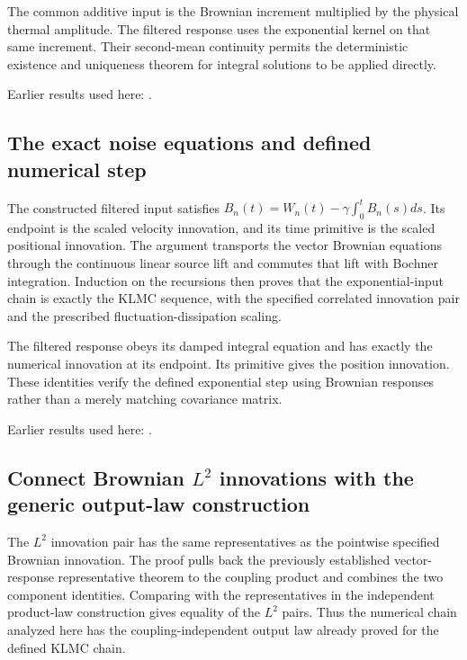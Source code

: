 \documentclass[11pt,a4paper]{report}
\begin{document}
The common additive input is the Brownian increment multiplied by the physical thermal amplitude. The filtered response uses the exponential kernel on that same increment. Their second-mean continuity permits the deterministic existence and uniqueness theorem for integral solutions to be applied directly.



Earlier results used here: \cite[Section~3.17.1]{LangevinLean2026ULASC}.
\subsection{\texorpdfstring{The exact noise equations and defined numerical step}{The exact noise equations and defined numerical step}}
\label{report-step-KineticLangevin-CanonicalCoupledSegments-lean-3}


The constructed filtered input satisfies \(B_n(t)=W_n(t)-\gamma\int_0^tB_n(s)ds\). Its endpoint is the scaled velocity innovation, and its time primitive is the scaled positional innovation. The argument transports the vector Brownian equations through the continuous linear source lift and commutes that lift with Bochner integration. Induction on the recursions then proves that the exponential-input chain is exactly the KLMC sequence, with the specified correlated innovation pair and the prescribed fluctuation-dissipation scaling.



The filtered response obeys its damped integral equation and has exactly the numerical innovation at its endpoint. Its primitive gives the position innovation. These identities verify the defined exponential step using Brownian responses rather than a merely matching covariance matrix.



Earlier results used here: \cite[Section~3.17.1]{LangevinLean2026ULASC}.
\subsection{\texorpdfstring{Connect Brownian \(L^{2}\) innovations with the generic output-law construction}{Connect Brownian L² innovations with the generic output-law construction}}
\label{report-step-KineticLangevin-CanonicalCoupledSegments-lean-4}


The \(L^{2}\) innovation pair has the same representatives as the pointwise specified Brownian innovation. The proof pulls back the previously established vector-response representative theorem to the coupling product and combines the two component identities. Comparing with the representatives in the independent product-law construction gives equality of the \(L^{2}\) pairs. Thus the numerical chain analyzed here has the coupling-independent output law already proved for the defined KLMC chain.
\end{document}
